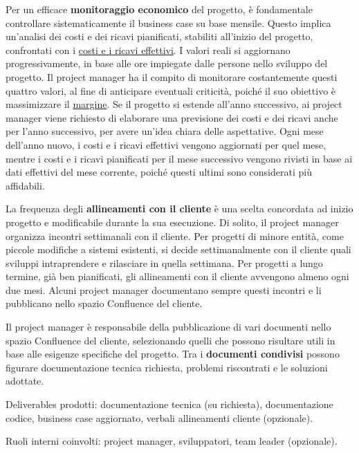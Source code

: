         Per un efficace \textbf{monitoraggio economico} del progetto, è fondamentale controllare sistematicamente il business case su base mensile.
        Questo implica un'analisi dei costi e dei ricavi pianificati, stabiliti all'inizio del progetto, confrontati con i \underline{costi e i ricavi effettivi}.
        I valori reali si aggiornano progressivamente, in base alle ore impiegate dalle persone nello sviluppo del progetto. 
        Il project manager ha il compito di monitorare costantemente questi quattro valori, al fine di anticipare eventuali criticità, poiché il suo
        obiettivo è massimizzare il \underline{margine}. Se il progetto si estende all'anno successivo, ai project manager viene richiesto di elaborare una previsione
        dei costi e dei ricavi anche per l'anno successivo, per avere un'idea chiara delle aspettative. 
        Ogni mese dell'anno nuovo, i costi e i ricavi effettivi vengono aggiornati per quel mese, mentre i costi e i ricavi pianificati per il mese successivo
        vengono rivisti in base ai dati effettivi del mese corrente, poiché questi ultimi sono considerati più affidabili.

        La frequenza degli \textbf{allineamenti con il cliente} è una scelta concordata ad inizio progetto e modificabile durante la sua esecuzione. Di solito,
        il project manager organizza incontri settimanali con il cliente. Per progetti di minore entità, come piccole modifiche a sistemi esistenti, si decide
        settimanalmente con il cliente quali sviluppi intraprendere e rilasciare in quella settimana. Per progetti a lungo termine, già ben pianificati, gli
        allineamenti con il cliente avvengono almeno ogni due mesi. Alcuni project manager documentano sempre questi incontri e li pubblicano nello spazio Confluence del cliente.

        Il project manager è responsabile della pubblicazione di vari documenti nello spazio Confluence del cliente, selezionando quelli che possono risultare
        utili in base alle esigenze specifiche del progetto. Tra i \textbf{documenti condivisi} possono figurare documentazione tecnica richiesta, problemi riscontrati e le soluzioni adottate.

        Deliverables prodotti: documentazione tecnica (su richiesta), documentazione codice, business case aggiornato, verbali allineamenti cliente (opzionale).

        Ruoli interni coinvolti: project manager, sviluppatori, team leader (opzionale).

